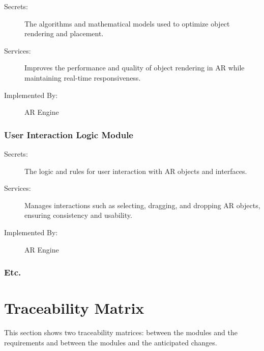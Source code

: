 \documentclass[12pt, titlepage]{article}
\begin{document}
\begin{description}
\item[Secrets:] The algorithms and mathematical models used to optimize object rendering and placement.
\item[Services:] Improves the performance and quality of object rendering in AR while maintaining real-time responsiveness.
\item[Implemented By:] AR Engine
\end{description}

\subsubsection{User Interaction Logic Module}

\begin{description}
\item[Secrets:] The logic and rules for user interaction with AR objects and interfaces.
\item[Services:] Manages interactions such as selecting, dragging, and dropping AR objects, ensuring consistency and usability.
\item[Implemented By:] AR Engine
\end{description}


\subsubsection{Etc.}

\section{Traceability Matrix} \label{SecTM}

This section shows two traceability matrices: between the modules and the
requirements and between the modules and the anticipated changes.
\end{document}
